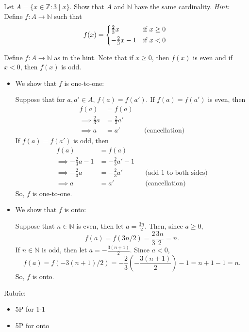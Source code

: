 \documentclass{article}
\newcommand{\Z}{\mathbb{Z}}
\newcommand{\N}{\mathbb{N}}
\theoremstyle{definition}
\begin{document}
\begin{question}{10}
    Let \(A = \{ x \in \Z : 3\mid x \}\).  Show that \(A\) and \(\mathbb{N}\) have the same cardinality.  \textit{Hint:} Define \(f\colon A \rightarrow \N\) such that
    \[
        f(x) = \begin{cases*}
                    \frac{2}{3}x & if \(x \geq 0\)\\
                    -\frac{2}{3}x-1 & if \( x < 0 \)
               \end{cases*}
    \]
\end{question}
\begin{solution}
Define \( f \colon A \to \N \) as in the hint.
Note that if \(x \geq 0\), then \(f(x)\) is even and if \(x < 0\), then \(f(x)\) is odd.

\begin{itemize}
\item We show that \(f\) is one-to-one:

Suppose that for \(a, a' \in A\), \(f(a) = f(a')\).  If \(f(a) = f(a')\) is even, then
\begin{align*}
    f(a) &= f(a) 
    \\\implies \tfrac{2}{3} a &= \tfrac{2}{3} a'
    \\\implies a &= a' &&\text{(cancellation)}
\end{align*}
If \(f(a) = f(a')\) is odd, then
\begin{align*}
    f(a) &= f(a) 
    \\\implies -\tfrac{2}{3} a - 1 &= -\tfrac{2}{3} a' - 1
    \\\implies -\tfrac{2}{3} a &= -\tfrac{2}{3} a' && \text{(add \(1\) to both sides)}
    \\\implies a &= a' &&\text{(cancellation)}
\end{align*}
So, \(f\) is one-to-one.
\item We show that \(f\) is onto:

Suppose that \(n \in \N\) is even, then let \(a = \frac{3n}{2}\).  Then, since \(a \geq 0\), 
\[ f(a) = f(3n/2) = \frac{2}{3} \frac{3n}{2} = n. \]
If \(n \in \N\) is odd, then let \(a = -\frac{3(n+1)}{2}\).  Since \(a < 0\),
\[ f(a) = f(-3(n+1)/2) = -\frac{2}{3}\left(-\frac{3(n+1)}{2}\right) - 1 =  n+1 - 1 = n.\]
So, \(f\) is onto.

\end{itemize}
{\color{red} Rubric:
\begin{itemize}
\item 5P for 1-1
\item 5P for onto
\end{itemize}}
\end{solution}
\end{document}
